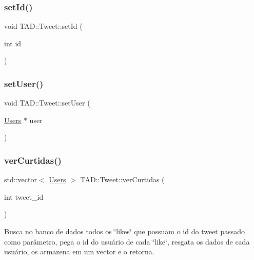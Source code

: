 \mbox{\label{class_t_a_d_1_1_tweet_a97b90ec1437cb5d449ab6fa29b81b64c}} 
\subsubsection{\texorpdfstring{set\+Id()}{setId()}}
{\footnotesize\ttfamily void T\+A\+D\+::\+Tweet\+::set\+Id (\begin{DoxyParamCaption}\item[{int}]{id }\end{DoxyParamCaption})}

\mbox{\label{class_t_a_d_1_1_tweet_ae7cf435af414cdae915f9644a199ed4f}} 
\subsubsection{\texorpdfstring{set\+User()}{setUser()}}
{\footnotesize\ttfamily void T\+A\+D\+::\+Tweet\+::set\+User (\begin{DoxyParamCaption}\item[{\hyperlink{class_t_a_d_1_1_users}{Users} $\ast$}]{user }\end{DoxyParamCaption})}

\mbox{\label{class_t_a_d_1_1_tweet_a6e5abea7662510af5063bbbea3feea7e}} 
\subsubsection{\texorpdfstring{ver\+Curtidas()}{verCurtidas()}}
{\footnotesize\ttfamily std\+::vector$<$ \hyperlink{class_t_a_d_1_1_users}{Users} $>$ T\+A\+D\+::\+Tweet\+::ver\+Curtidas (\begin{DoxyParamCaption}\item[{int}]{tweet\+\_\+id }\end{DoxyParamCaption})}



Busca no banco de dados todos os \char`\"{}likes\char`\"{} que possuam o id do tweet passado como parâmetro, pega o id do usuário de cada \char`\"{}like\char`\"{}, resgata os dados de cada usuário, os armazena em um vector e o retorna. 


